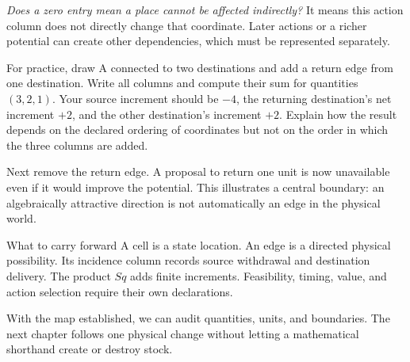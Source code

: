 \emph{Does a zero entry mean a place cannot be affected indirectly?} It means this action column does not directly change that coordinate. Later actions or a richer potential can create other dependencies, which must be represented separately.

For practice, draw A connected to two destinations and add a return edge from one destination. Write all columns and compute their sum for quantities \((3,2,1)\). Your source increment should be \(-4\), the returning destination's net increment \(+2\), and the other destination's increment \(+2\). Explain how the result depends on the declared ordering of coordinates but not on the order in which the three columns are added.

Next remove the return edge. A proposal to return one unit is now unavailable even if it would improve the potential. This illustrates a central boundary: an algebraically attractive direction is not automatically an edge in the physical world.

\begin{intuitionbox}{What to carry forward}
A cell is a state location. An edge is a directed physical possibility. Its incidence column records source withdrawal and destination delivery. The product \(Sq\) adds finite increments. Feasibility, timing, value, and action selection require their own declarations.
\end{intuitionbox}

With the map established, we can audit quantities, units, and boundaries. The next chapter follows one physical change without letting a mathematical shorthand create or destroy stock.
